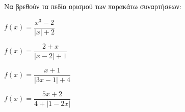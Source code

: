 Να βρεθούν τα πεδία ορισμού των παρακάτω συναρτήσεων:
\begin{alist}
\item $ f(x)=\dfrac{x^3-2}{|x|+2} $
\item $ f(x)=\dfrac{2+x}{|x-2|+1} $
\item $ f(x)=\dfrac{x+1}{|3x-1|+4} $
\item $ f(x)=\dfrac{5x+2}{4+|1-2x|} $
\end{alist}
